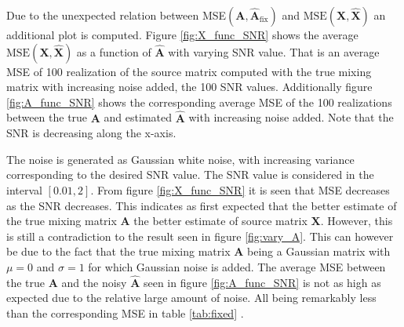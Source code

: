 Due to the unexpected relation between MSE$(\mathbf{A}, \hat{\mathbf{A}}_{\text{fix}})$ and $\text{MSE}(\mathbf{X}, \hat{\mathbf{X}})$ an additional plot is computed. 
Figure \ref{fig:X_func_SNR} shows the average $\text{MSE}(\mathbf{X}, \hat{\mathbf{X}})$ as a function of $\hat{\mathbf{A}}$ with varying SNR value. 
That is an average MSE of 100 realization of the source matrix computed with the true mixing matrix with increasing noise added, the 100 SNR values. 
Additionally figure \ref{fig:A_func_SNR} shows the corresponding average MSE of the 100 realizations between the true $\mathbf{A}$ and estimated $\hat{\mathbf{A}}$ with increasing noise added.
Note that the SNR is decreasing along the x-axis. 

The noise is generated as Gaussian white noise, with increasing variance corresponding to the desired SNR value. 
The SNR value is considered in the interval $[0.01, 2]$. 
From figure \ref{fig:X_func_SNR} it is seen that MSE decreases as the SNR decreases. 
This indicates as first expected that the better estimate of the true mixing matrix $\mathbf{A}$ the better estimate of source matrix $\mathbf{X}$. 
However, this is still a contradiction to the result seen in figure \ref{fig:vary_A}. 
This can however be due to the fact that the true mixing matrix $\mathbf{A}$ being a Gaussian matrix with $\mu = 0$ and $\sigma = 1$ for which Gaussian noise is added. 
The average MSE between the true $\mathbf{A}$ and the noisy $\hat{\mathbf{A}}$ seen in figure \ref{fig:A_func_SNR} is not as high as expected due to the relative large amount of noise. 
All being remarkably less than the corresponding MSE in table \ref{tab:fixed} .  
